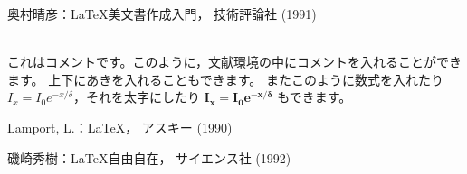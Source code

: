 \begin{thebibliography}{99}
奥村晴彦：\LaTeX 美文書作成入門，
技術評論社 (1991)

\begin{bibcomment}
　\\
これはコメントです。このように，文献環境の中にコメントを入れることができます。
上下にあきを入れることもできます。
またこのように数式を入れたり$I_x = I_0e^{-x/\delta}$，それを太字にしたり
$\boldsymbol{I_x = I_0e^{-x/\delta}}$
もできます。\\

\end{bibcomment}

Lamport, L.：\LaTeX，
アスキー (1990)

磯崎秀樹：\LaTeX 自由自在，
サイエンス社 (1992)

\end{thebibliography}
